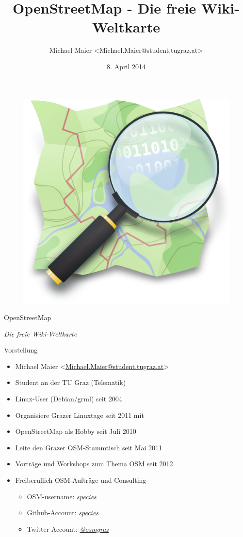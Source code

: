 \documentclass{beamer}
\title{OpenStreetMap - Die freie Wiki-Weltkarte}
\author{Michael Maier \textless Michael.Maier@student.tugraz.at\textgreater}
\date{8. April 2014}
\begin{document}

\begin{frame} 


\begin{figure}
  \centering
  \includegraphics[width=.5\textwidth]{mag_map.png}
\end{figure}

\begin{center}
\Huge{OpenStreetMap\\}
\end{center}

\begin{center}
\Large{\emph{Die freie Wiki-Weltkarte}}
\end{center}

\end{frame}


\begin{frame}{Vorstellung}

  \begin{itemize}
    \item Michael Maier \textless \href{mailto:Michael.Maier@student.tugraz.at}{Michael.Maier@student.tugraz.at}\textgreater
    \item Student an der TU Graz (Telematik)
\vspace{0.3cm}
    \item Linux-User (Debian/grml) seit 2004
    \item Organisiere Grazer Linuxtage seit 2011 mit
    \item OpenStreetMap als Hobby seit Juli 2010
    \item Leite den Grazer OSM-Stammtisch seit Mai 2011
\vspace{0.3cm}
    \item Vorträge und Workshops zum Thema OSM seit 2012
    \item Freiberuflich OSM-Aufträge und Consulting
    \begin{itemize}
      \item OSM-username: \emph{\href{http://www.openstreetmap.org/user/species}{species}}
      \item Github-Account: \emph{\href{https://github.com/species}{species}}
      \item Twitter-Account: \emph{\href{https://twitter.com/osmgraz}{@osmgraz}}
    \end{itemize}
  \end{itemize}
\end{frame}
\end{document}
